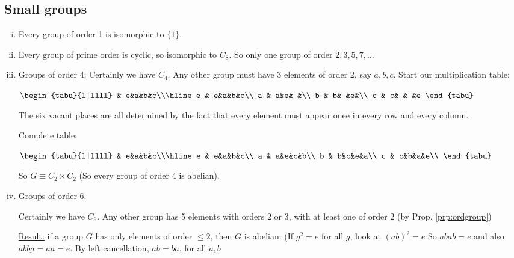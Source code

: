 \documentclass{article}
\theoremstyle{definition} \newtheorem*{definition}{Definition}
\begin{document}
\subsection{Small groups} \begin{enumerate}[(i)] \item Every group of order 1 is
    isomorphic to $\{1\}$.  \item Every group of prime order is cyclic, so
      isomorphic to $C_8$. So only one group of order $2,3,5,7,\ldots$

\item Groups of order 4: Certainly we have $C_4$. Any other group must have 3
  elements of order 2, say $a,b,c$. Start our multiplication table:

  \begin{table}[h] \centering $\begin{tabu}{l|llll} & e&a&b&c\\\hline e &
      e&a&b&c\\ a & a&e& &\\ b & b& &e&\\ c & c& & &e \end{tabu}$
    \label{tab:startedtable} \end{table}

The six vacant places are all determined by the fact that every element must
appear onee in every row and every column.

Complete table: \begin{table}[h] \centering $\begin{tabu}{l|llll} &
    e&a&b&c\\\hline e & e&a&b&c\\ a & a&e&c&b\\ b & b&c&e&a\\ c & c&b&a&e\\
  \end{tabu}$ \label{tab:completesimpletable} \end{table}

So $G \equiv C_2 \times C_2$ (So every group of order 4 is abelian).

\item Groups of order 6.

  Certainly we have $C_6$. Any other group has 5 elements with orders 2 or 3,
  with at least one of order 2 (by Prop. \ref{prp:ordgroup})

  \underline{Result:} if a group $G$ has only elements of order $\leq 2$, then
  $G$ is abelian. (If $g^2 = e$ for all $g$, look at $(ab)^2 = e$ So
  $ab\underline{ab}=e$ and also $ab\underline{ba}=aa=e$. By left cancellation,
  $ab=ba$, for all $a,b$


\end{enumerate}
\end{document}
